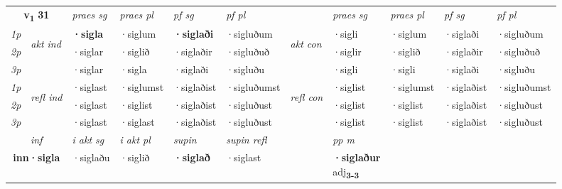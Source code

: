 \noindent
\begin{tabular}{lllllllllll} \toprule
\multicolumn{2}{c}{\textbf{v{\textsubscript{1}}} \Large{\textbf{31}}}  &  \textit{praes sg}  & \textit{praes pl}  &\textit{ pf sg} & \textit{pf pl} &  &  \textit{praes sg}  & \textit{praes pl}  & \textit{pf sg} & \textit{pf pl } \\*
	\cmidrule{3-6} \cmidrule{8-11}
 {\textit{1p}} & \multirow{3}{*}{\begin{turn}{90}\textit{akt ind}\end{turn}} & \textbf{·sigla} & ·siglum & \textbf{·siglaði} & ·sigluðum & \multirow{3}{*}{\begin{turn}{90}\textit{akt con}\end{turn}} &·sigli & ·siglum & ·siglaði & ·sigluðum\\*
 {\textit{2p}} &  &  ·siglar  & ·siglið & ·siglaðir & ·sigluðuð & & ·siglir & ·siglið & ·siglaðir & ·sigluðuð \\*
{\textit{3p}} &  & ·siglar & ·sigla & ·siglaði & ·sigluðu & & ·sigli & ·sigli& ·siglaði & ·sigluðu \\*
\cmidrule{3-6} \cmidrule{8-11}
 {\textit{1p}} & \multirow{3}{*}{\begin{turn}{90}\textit{refl ind}\end{turn}}  & ·siglast & ·siglumst & ·siglaðist & ·sigluðumst & \multirow{3}{*}{\begin{turn}{90}\textit{refl con}\end{turn}}  &·siglist & ·siglumst & ·siglaðist & ·sigluðumst \\*
 {\textit{2p}} &  & ·siglast & ·siglist & ·siglaðist & ·sigluðust & &·siglist & ·siglist & ·siglaðist & ·sigluðust \\*
 {\textit{3p}}  & & ·siglast & ·siglast & ·siglaðist & ·sigluðust & & ·siglist & ·siglist& ·siglaðist & ·sigluðust \\*
\cmidrule{3-6} \cmidrule{8-11}

   \multicolumn{2}{c}{\textit{inf}}  & \textit{i akt sg} & \textit{i akt pl}    & \textit{supin} & \textit{supin refl} && \textit{pp m} \\*
  \multicolumn{2}{c}{\textbf{inn\allowbreak ·sigla}} & ·siglaðu  & ·siglið    &  \textbf{·siglað} & ·siglast && \specialcell{\textbf{·siglaður} \\ adj\textbf{\textsubscript{3-3}}} \\*
\end{tabular}

